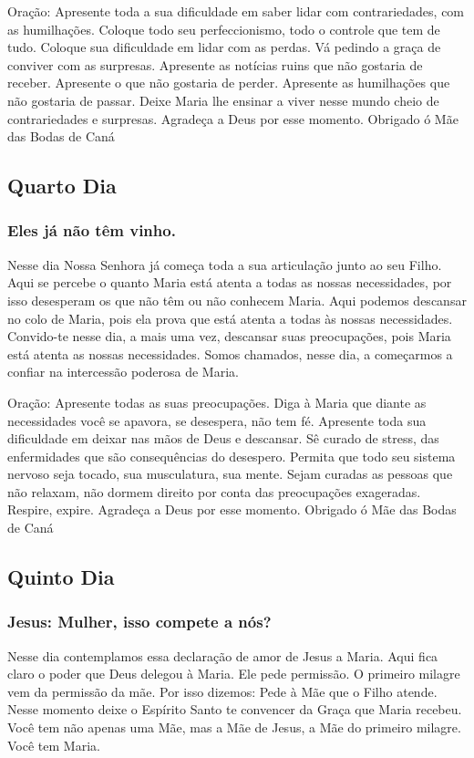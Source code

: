\documentclass[11pt]{article}
\begin{document}
Oração: Apresente toda a sua dificuldade em saber lidar com contrariedades, com as humilhações.  Coloque todo seu perfeccionismo, todo o controle que tem de tudo. Coloque sua dificuldade em lidar com as perdas. Vá pedindo a graça de conviver com as surpresas.  Apresente as notícias ruins que não gostaria de receber.  Apresente o que não gostaria de perder. Apresente as humilhações que não gostaria de passar. Deixe Maria lhe ensinar a viver nesse mundo cheio de contrariedades e surpresas. Agradeça a Deus por esse momento. Obrigado ó Mãe das Bodas de Caná

\subsection{Quarto Dia}
\subsubsection*{Eles já não têm vinho.}
Nesse dia Nossa Senhora já começa toda a sua articulação junto ao seu Filho. Aqui se percebe o quanto Maria está atenta a todas as nossas necessidades, por isso desesperam os que não têm ou não conhecem Maria. Aqui podemos descansar no colo de Maria, pois ela prova que está atenta a todas às nossas necessidades. Convido-te nesse dia, a mais uma vez, descansar suas preocupações, pois Maria está atenta as nossas necessidades. Somos chamados, nesse dia, a começarmos a confiar na intercessão poderosa de Maria.

Oração: Apresente todas as suas preocupações. Diga à Maria que diante as necessidades você se apavora, se desespera, não tem fé. Apresente toda sua dificuldade em deixar nas mãos de Deus e descansar. Sê curado de stress, das enfermidades que são consequências do desespero.  Permita que todo seu sistema nervoso seja tocado, sua musculatura, sua mente. Sejam curadas as pessoas que não relaxam, não dormem direito por conta das preocupações exageradas. Respire, expire. Agradeça a Deus por esse momento. Obrigado ó Mãe das Bodas de Caná

\subsection{Quinto Dia}
\subsubsection*{ Jesus: Mulher, isso compete a nós?}
Nesse dia contemplamos essa declaração de amor de Jesus a Maria. Aqui fica claro o poder que Deus delegou à Maria. Ele pede permissão. O primeiro milagre vem da permissão da mãe. Por isso dizemos: Pede à Mãe que o Filho atende. Nesse momento deixe o Espírito Santo te convencer da Graça que Maria recebeu. Você tem não apenas uma Mãe, mas a Mãe de Jesus, a Mãe do primeiro milagre. Você tem Maria.
\end{document}
